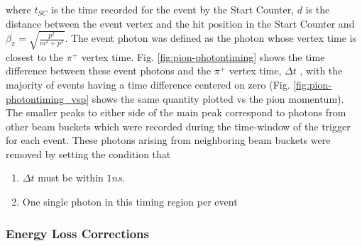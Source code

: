 where $t_{SC}$ is the time recorded for the event by the Start Counter, $d$ is the distance between the event vertex and the hit position in the Start Counter  and $\beta_\pi = \sqrt{\frac{p^2}{m^2 + p^2}} $.  The event photon was defined as the photon whose vertex time is closest to the $\pi^+$ vertex time. Fig. \ref{fig:pion-photontiming} shows the time difference between these event photons and the $\pi^+$ vertex time, $\Delta t$ , with the majority of events having a time difference centered on zero (Fig. \ref{fig:pion-photontiming_vsp} shows the same quantity plotted vs the pion momentum). The smaller peaks to either side of the main peak correspond to photons from other beam buckets which were recorded during the time-window of the trigger for each event. These photons arising from neighboring beam buckets were removed by setting the condition that 
\begin{enumerate}
\item $\Delta t$ must be within $1 ns$. 
\item One single photon in this timing region per event
\end{enumerate}


\subsubsection{Energy Loss Corrections}

